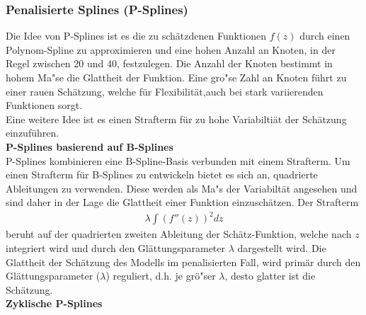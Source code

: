 \documentclass[12pt]{article}
\begin{document}
	\subsubsection{Penalisierte Splines (P-Splines)} 
	Die Idee von P-Splines ist es die zu schätzdenen Funktionen $f(z)$ durch einen Polynom-Spline zu approximieren und eine hohen Anzahl an Knoten, in der Regel zwischen 20 und 40, festzulegen. Die Anzahl der Knoten bestimmt in hohem Ma"se die Glattheit der Funktion. Eine gro"se Zahl an Knoten führt zu einer rauen Schätzung, welche für Flexibilität,auch bei stark variierenden Funktionen sorgt. \\
	Eine weitere Idee ist es einen Strafterm für zu hohe Variabiltiät der Schätzung einzuführen. \\
	\newpage
	\noindent\textbf{P-Splines basierend auf B-Splines} \\
	P-Splines kombinieren eine B-Spline-Basis verbunden mit einem Strafterm. Um einen Strafterm für B-Splines zu entwickeln bietet es sich an, quadrierte Ableitungen zu verwenden. Diese werden als Ma"s der Variabiltät angesehen und sind daher in der Lage die Glattheit einer Funktion einzuschätzen.
	Der Strafterm 
	\begin{align}
	\lambda\int(f''(z))^2dz
	\end{align}
	beruht auf der quadrierten zweiten Ableitung der Schätz-Funktion, welche nach $z$ integriert wird und durch den Glättungsparameter $\lambda$ dargestellt wird. Die Glattheit der Schätzung des Modells im penalisierten Fall, wird primär durch den Glättungsparameter ($\lambda$) reguliert, d.h. je grö"ser $\lambda$, desto glatter ist die Schätzung.\\
	
	\noindent\textbf{Zyklische P-Splines} \\
	
	
	


	
\end{document}
